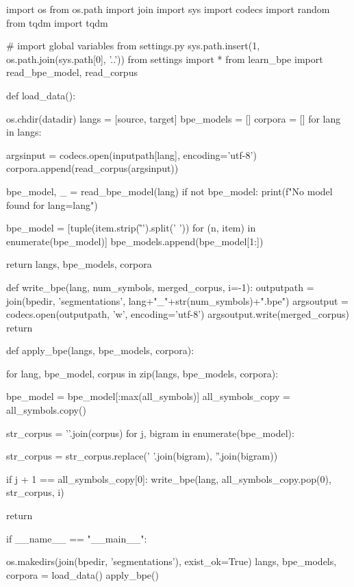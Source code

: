 \begin{python}
import os
from os.path import join
import sys
import codecs
import random
from tqdm import tqdm

# import global variables from settings.py
sys.path.insert(1, os.path.join(sys.path[0], '..'))
from settings import *
from learn_bpe import read_bpe_model, read_corpus

def load_data():

    os.chdir(datadir)
    langs = [source, target]
    bpe_models = []
    corpora = []
    for lang in langs:

        argsinput = codecs.open(inputpath[lang], encoding='utf-8')
        corpora.append(read_corpus(argsinput))

        bpe_model, _ = read_bpe_model(lang)
        if not bpe_model:
            print(f"No model found for lang={lang}")

        bpe_model = [tuple(item.strip('\r\n ').split(' ')) for (n, item) in enumerate(bpe_model)]
        bpe_models.append(bpe_model[1:])

    return langs, bpe_models, corpora


def write_bpe(lang, num_symbols, merged_corpus, i=-1):
    outputpath = join(bpedir, 'segmentations', lang+"_"+str(num_symbols)+".bpe")
    argsoutput = codecs.open(outputpath, 'w', encoding='utf-8')
    argsoutput.write(merged_corpus)
    return


def apply_bpe(langs, bpe_models, corpora):
    
    for lang, bpe_model, corpus in zip(langs, bpe_models, corpora):

        bpe_model = bpe_model[:max(all_symbols)]
        all_symbols_copy = all_symbols.copy()

        str_corpus = '\n'.join(corpus)
        for j, bigram in enumerate(bpe_model):

            str_corpus = str_corpus.replace(' '.join(bigram), ''.join(bigram))

            if j + 1 == all_symbols_copy[0]:
                write_bpe(lang, all_symbols_copy.pop(0), str_corpus, i)

    return


if __name__ == "__main__":

    os.makedirs(join(bpedir, 'segmentations'), exist_ok=True)
    langs, bpe_models, corpora = load_data()
    apply_bpe()

\end{python}